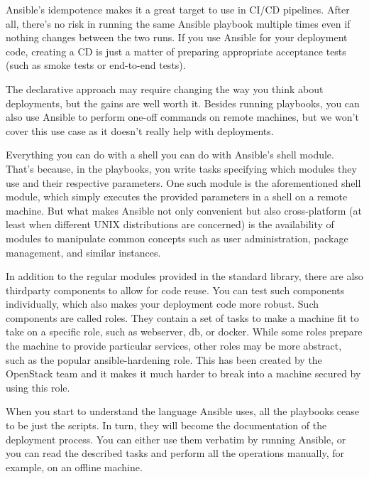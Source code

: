 
Ansible's idempotence makes it a great target to use in CI/CD pipelines. After all, there's no risk in running the same Ansible playbook multiple times even if nothing changes between the two runs. If you use Ansible for your deployment code, creating a CD is just a matter of preparing appropriate acceptance tests (such as smoke tests or end-to-end tests).

The declarative approach may require changing the way you think about deployments, but the gains are well worth it. Besides running playbooks, you can also use Ansible to perform one-off commands on remote machines, but we won't cover this use case as it doesn't really help with deployments.

Everything you can do with a shell you can do with Ansible's shell module. That's because, in the playbooks, you write tasks specifying which modules they use and their respective parameters. One such module is the aforementioned shell module, which simply executes the provided parameters in a shell on a remote machine. But what makes Ansible not only convenient but also cross-platform (at least when different UNIX distributions are concerned) is the availability of modules to manipulate common concepts such as user administration, package management, and similar instances.


In addition to the regular modules provided in the standard library, there are also thirdparty components to allow for code reuse. You can test such components individually, which also makes your deployment code more robust. Such components are called roles. They contain a set of tasks to make a machine fit to take on a specific role, such as webserver, db, or docker. While some roles prepare the machine to provide particular services, other roles may be more abstract, such as the popular ansible-hardening role. This has been created by the OpenStack team and it makes it much harder to break into a machine secured by using this role.

When you start to understand the language Ansible uses, all the playbooks cease to be just the scripts. In turn, they will become the documentation of the deployment process. You can either use them verbatim by running Ansible, or you can read the described tasks and perform all the operations manually, for example, on an offline machine.

